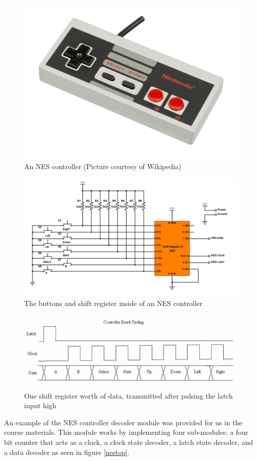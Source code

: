 \documentclass[a4paper]{article}
\begin{document}
\begin{figure}[H]
    \includegraphics[width=0.6 \linewidth]{images/NEScontroller.jpg}
    \caption{An NES controller (Picture courtesy of Wikipedia)}
    \label{nesController}
\end{figure}

\begin{figure}[H]
    \includegraphics[width=0.8 \linewidth]{images/nesSchema.png}
    \caption{The buttons and shift register inside of an NES controller}
    \label{nesSchematic}
\end{figure}


\begin{figure}[H]
    \includegraphics[width=0.8 \linewidth]{images/nesclock.jpg}
    \caption{One shift register worth of data, transmitted after pulsing the latch input high}
    \label{nesClock}
\end{figure}

An example of the NES controller decoder module was provided for us in the course materials. This module works by implementing four sub-modules: a four bit counter that acts as a clock, a clock state decoder, a latch state decoder, and a data decoder as seen in figure \ref{nestop}.  
\end{document}
